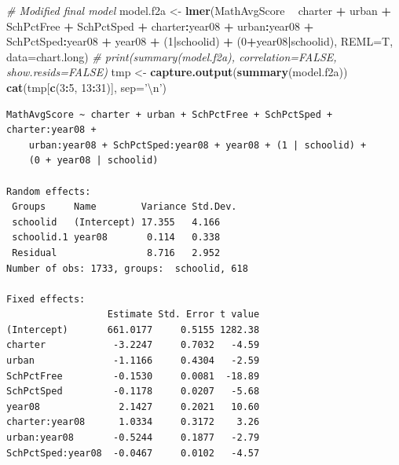 \documentclass[
]{krantz}
\newenvironment{Shaded}{\begin{snugshade}}{\end{snugshade}}
\newcommand{\CharTok}[1]{\textcolor[rgb]{0.5,0.5,0.5}{#1}}
\newcommand{\CommentTok}[1]{\textcolor[rgb]{0.37,0.37,0.37}{\textit{#1}}}
\newcommand{\DataTypeTok}[1]{\textcolor[rgb]{0.27,0.27,0.27}{#1}}
\newcommand{\DecValTok}[1]{\textcolor[rgb]{0.06,0.06,0.06}{#1}}
\newcommand{\KeywordTok}[1]{\textcolor[rgb]{0.27,0.27,0.27}{\textbf{#1}}}
\newcommand{\NormalTok}[1]{#1}
\newcommand{\OperatorTok}[1]{\textcolor[rgb]{0.43,0.43,0.43}{\textbf{#1}}}
\newcommand{\StringTok}[1]{\textcolor[rgb]{0.5,0.5,0.5}{#1}}
\begin{document}
\begin{Shaded}
\begin{Highlighting}[]
\CommentTok{# Modified final model}
\NormalTok{model.f2a <-}\StringTok{ }\KeywordTok{lmer}\NormalTok{(MathAvgScore }\OperatorTok{~}\StringTok{ }\NormalTok{charter }\OperatorTok{+}\StringTok{ }\NormalTok{urban }\OperatorTok{+}\StringTok{ }\NormalTok{SchPctFree }\OperatorTok{+}
\StringTok{  }\NormalTok{SchPctSped }\OperatorTok{+}\StringTok{ }\NormalTok{charter}\OperatorTok{:}\NormalTok{year08 }\OperatorTok{+}\StringTok{ }\NormalTok{urban}\OperatorTok{:}\NormalTok{year08 }\OperatorTok{+}
\StringTok{  }\NormalTok{SchPctSped}\OperatorTok{:}\NormalTok{year08 }\OperatorTok{+}\StringTok{ }\NormalTok{year08 }\OperatorTok{+}
\StringTok{  }\NormalTok{(}\DecValTok{1}\OperatorTok{|}\NormalTok{schoolid) }\OperatorTok{+}\StringTok{ }\NormalTok{(}\DecValTok{0}\OperatorTok{+}\NormalTok{year08}\OperatorTok{|}\NormalTok{schoolid), }\DataTypeTok{REML=}\NormalTok{T, }\DataTypeTok{data=}\NormalTok{chart.long)}
\CommentTok{# print(summary(model.f2a), correlation=FALSE, show.resids=FALSE)}
\NormalTok{tmp <-}\StringTok{ }\KeywordTok{capture.output}\NormalTok{(}\KeywordTok{summary}\NormalTok{(model.f2a))}
\KeywordTok{cat}\NormalTok{(tmp[}\KeywordTok{c}\NormalTok{(}\DecValTok{3}\OperatorTok{:}\DecValTok{5}\NormalTok{, }\DecValTok{13}\OperatorTok{:}\DecValTok{31}\NormalTok{)], }\DataTypeTok{sep=}\StringTok{'}\CharTok{\textbackslash{}n}\StringTok{'}\NormalTok{)}
\end{Highlighting}
\end{Shaded}

\begin{verbatim}
MathAvgScore ~ charter + urban + SchPctFree + SchPctSped + charter:year08 +  
    urban:year08 + SchPctSped:year08 + year08 + (1 | schoolid) +  
    (0 + year08 | schoolid)

Random effects:
 Groups     Name        Variance Std.Dev.
 schoolid   (Intercept) 17.355   4.166   
 schoolid.1 year08       0.114   0.338   
 Residual                8.716   2.952   
Number of obs: 1733, groups:  schoolid, 618

Fixed effects:
                  Estimate Std. Error t value
(Intercept)       661.0177     0.5155 1282.38
charter            -3.2247     0.7032   -4.59
urban              -1.1166     0.4304   -2.59
SchPctFree         -0.1530     0.0081  -18.89
SchPctSped         -0.1178     0.0207   -5.68
year08              2.1427     0.2021   10.60
charter:year08      1.0334     0.3172    3.26
urban:year08       -0.5244     0.1877   -2.79
SchPctSped:year08  -0.0467     0.0102   -4.57
\end{verbatim}
\end{document}
